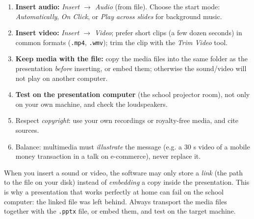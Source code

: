 \documentclass[11pt]{article}
\begin{document}
\begin{methode}
\begin{enumerate}
\item \textbf{Insert audio:} \emph{Insert $\rightarrow$ Audio} (from file). Choose the start mode: \emph{Automatically}, \emph{On Click}, or \emph{Play across slides} for background music.
\item \textbf{Insert video:} \emph{Insert $\rightarrow$ Video}; prefer short clips (a few dozen seconds) in common formats (\texttt{.mp4}, \texttt{.wmv}); trim the clip with the \emph{Trim Video} tool.
\item \textbf{Keep media with the file:} copy the media files into the same folder as the presentation \emph{before} inserting, or embed them; otherwise the sound/video will not play on another computer.
\item \textbf{Test on the presentation computer} (the school projector room), not only on your own machine, and check the loudspeakers.
\item Respect \emph{copyright}: use your own recordings or royalty-free media, and cite sources.
\item Balance: multimedia must \emph{illustrate} the message (e.g. a 30 s video of a mobile money transaction in a talk on e-commerce), never replace it.
\end{enumerate}
\end{methode}

\begin{savaistu}
When you insert a sound or video, the software may only store a \emph{link} (the path to the file on your disk) instead of \emph{embedding} a copy inside the presentation. This is why a presentation that works perfectly at home can fail on the school computer: the linked file was left behind. Always transport the media files together with the \texttt{.pptx} file, or embed them, and test on the target machine.
\end{savaistu}
\end{document}

